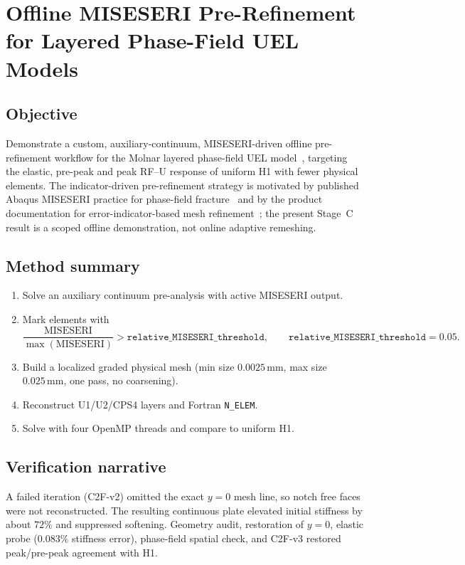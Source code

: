 \chapter{Offline MISESERI Pre-Refinement for Layered Phase-Field UEL Models}
\label{ch:stage-c-offline-refinement}

\section{Objective}
Demonstrate a custom, auxiliary-continuum, MISESERI-driven offline
pre-refinement workflow for the Molnar layered phase-field UEL
model~\cite{molnar2017}, targeting the elastic, pre-peak and peak RF--U
response of uniform H1 with fewer physical elements. The indicator-driven
pre-refinement strategy is motivated by published Abaqus MISESERI practice for
phase-field fracture~\cite{pandey2025} and by the product documentation for
error-indicator-based mesh refinement~\cite{abaqus2023}; the present Stage~C
result is a scoped offline demonstration, not online adaptive remeshing.

\section{Method summary}
\begin{enumerate}
  \item Solve an auxiliary continuum pre-analysis with active MISESERI output.
  \item Mark elements with
  \[
    \frac{\mathrm{MISESERI}}{\max(\mathrm{MISESERI})}
    > \texttt{relative\_MISESERI\_threshold},\qquad
    \texttt{relative\_MISESERI\_threshold}=0.05.
  \]
  \item Build a localized graded physical mesh (min size $0.0025\,\mathrm{mm}$,
  max size $0.025\,\mathrm{mm}$, one pass, no coarsening).
  \item Reconstruct U1/U2/CPS4 layers and Fortran \texttt{N\_ELEM}.
  \item Solve with four OpenMP threads and compare to uniform H1.
\end{enumerate}

\section{Verification narrative}
A failed iteration (C2F-v2) omitted the exact $y=0$ mesh line, so notch free faces
were not reconstructed. The resulting continuous plate elevated initial stiffness
by about $72\%$ and suppressed softening. Geometry audit, restoration of $y=0$,
elastic probe ($0.083\%$ stiffness error), phase-field spatial check, and C2F-v3
restored peak/pre-peak agreement with H1.

